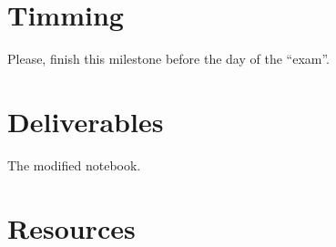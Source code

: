 \section{Timming}
Please, finish this milestone before the day of the ``exam''.

\section{Deliverables}
The modified notebook.

\section{Resources}
\renewcommand{\addcontentsline}[3]{} %




